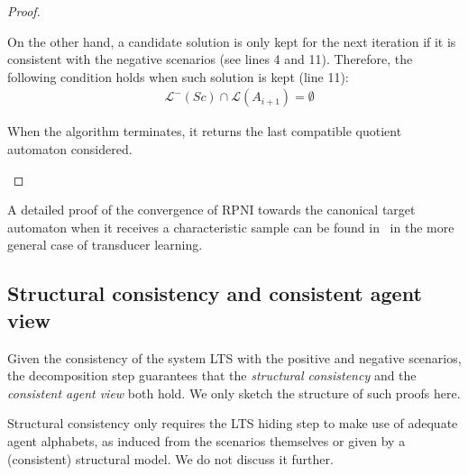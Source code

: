 \begin{theorem}
\begin{proof}
\begin{description}
On the other hand, a candidate solution is only kept for the next iteration if it is consistent with the negative scenarios (see lines 4 and 11). Therefore, the following condition holds when such solution is kept (line 11):
\begin{align*}
&\mathcal{L}^-(Sc) \cap \mathcal{L}(A_{i+1}) = \emptyset
\end{align*}

When the algorithm terminates, it returns the last compatible quotient automaton considered.
\end{description}
\end{proof}
\end{theorem}

A detailed proof of the convergence of RPNI towards the canonical target automaton when it receives a characteristic sample can be found in~\cite{Oncina:1993} in the more general case of transducer learning.


\subsection{Structural consistency and consistent agent view\label{subsection:consistent-agent-view}}

Given the consistency of the system LTS with the positive and negative scenarios, the decomposition step guarantees that the \emph{structural consistency} and the \emph{consistent agent view} both hold. We only sketch the structure of such proofs here. 

Structural consistency only requires the LTS hiding step to make use of adequate agent alphabets, as induced from the scenarios themselves or given by a (consistent) structural model. We do not discuss it further. 

